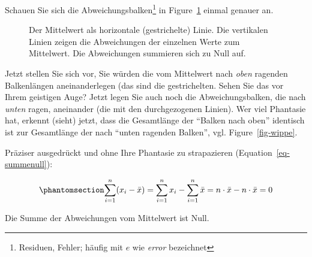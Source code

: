 \documentclass[
  letterpaper,
  DIV=11,
  numbers=noendperiod]{scrartcl}
\theoremstyle{definition}
\theoremstyle{definition}
\theoremstyle{definition}
\theoremstyle{remark}
\begin{document}
Schauen Sie sich die Abweichungsbalken\footnote{Residuen, Fehler; häufig
  mit \(e\) wie \emph{error} bezeichnet} in Figure~\ref{fig-mw1} einmal
genauer an.

\begin{figure}


\caption{\label{fig-mw1}Der Mittelwert als horizontale (gestrichelte)
Linie. Die vertikalen Linien zeigen die Abweichungen der einzelnen Werte
zum Mittelwert. Die Abweichungen summieren sich zu Null auf.}

\end{figure}%

Jetzt stellen Sie sich vor, Sie würden die vom Mittelwert nach
\emph{oben} ragenden Balkenlängen aneinanderlegen (das sind die
gestrichelten. Sehen Sie das vor Ihrem geistigen Auge? Jetzt legen Sie
auch noch die Abweichungsbalken, die nach \emph{unten} ragen, aneinander
(die mit den durchgezogenen Linien). Wer viel Phantasie hat, erkennt
(sieht) jetzt, dass die Gesamtlänge der ``Balken nach oben'' identisch
ist zur Gesamtlänge der nach ``unten ragenden Balken'', vgl.
Figure~\ref{fig-wippe}.

Präziser ausgedrückt und ohne Ihre Phantasie zu strapazieren
(Equation~\ref{eq-summenull}):

\begin{equation}\phantomsection\label{eq-summenull}{\sum_{i=1}^n (x_i-\bar{x})=\sum_{i=1}^n x_i - \sum_{i=1}^n \bar{x} = n\cdot \bar{x} - n\cdot \bar{x}=0}\end{equation}

\begin{tcolorbox}[enhanced jigsaw, breakable, toptitle=1mm, colback=white, leftrule=.75mm, colframe=quarto-callout-note-color-frame, colbacktitle=quarto-callout-note-color!10!white, title=\textcolor{quarto-callout-note-color}{\faInfo}\hspace{0.5em}{Note}, toprule=.15mm, opacityback=0, arc=.35mm, coltitle=black, rightrule=.15mm, titlerule=0mm, bottomtitle=1mm, bottomrule=.15mm, left=2mm, opacitybacktitle=0.6]

Die Summe der Abweichungen vom Mittelwert ist Null.

\end{tcolorbox}
\end{document}
